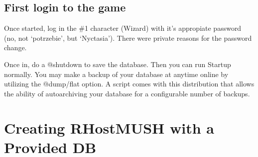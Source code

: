 \documentclass[letterpaper,10pt,english]{sphinxmanual}
\begin{document}
\begin{sphinxVerbatim}[commandchars=\\\{\}]
\PYG{p}{[}\PYG{p}{]}      
\PYG{p}{[}\PYG{p}{]}        
\end{sphinxVerbatim}


\subsection{First login to the game}
\label{\detokenize{install:first-login-to-the-game}}
\sphinxAtStartPar
Once started, log in the \#1 character (Wizard) with it’s appropiate
password (no, not ‘potrzebie’, but ‘Nyctasia’).  There were private
reasons for the password change.

\sphinxAtStartPar
Once in, do a @shutdown to save the database.  Then you can run Startup
normally.   You may make a backup of your database at anytime on\sphinxhyphen{}line by
utilizing the @dump/flat option.  A script comes with this distribution
that allows the ability of auto\sphinxhyphen{}archiving your database for a configurable
number of backups.


\section{Creating RHostMUSH with a Provided DB}
\label{\detokenize{install:creating-rhostmush-with-a-provided-db}}
\end{document}
